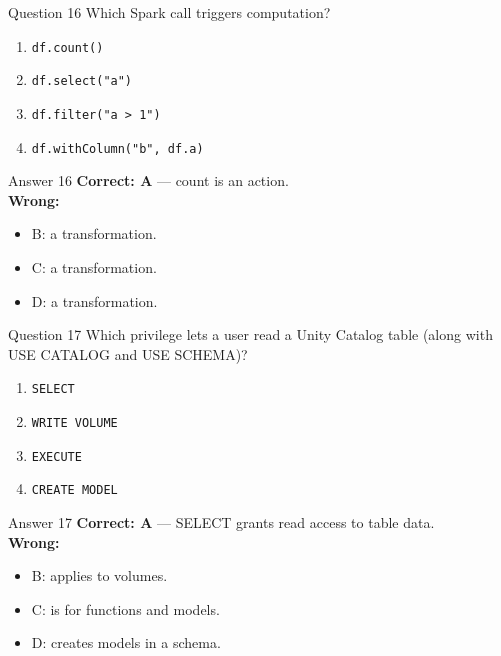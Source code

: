 \documentclass[aspectratio=169,11pt]{beamer}
\begin{document}
\begin{frame}{Question 16}
Which Spark call triggers computation?
\begin{enumerate}[label=\Alph*.]
\item \texttt{df.count()}
\item \texttt{df.select("a")}
\item \texttt{df.filter("a > 1")}
\item \texttt{df.withColumn("b", df.a)}
\end{enumerate}
\end{frame}
\begin{frame}{Answer 16}
\textbf{Correct: A} --- count is an action.\\
\vspace{0.5em}
\textbf{Wrong:}
\begin{itemize}
\item B: a transformation.
\item C: a transformation.
\item D: a transformation.
\end{itemize}
\end{frame}

\begin{frame}{Question 17}
Which privilege lets a user read a Unity Catalog table (along with USE CATALOG and USE SCHEMA)?
\begin{enumerate}[label=\Alph*.]
\item \texttt{SELECT}
\item \texttt{WRITE VOLUME}
\item \texttt{EXECUTE}
\item \texttt{CREATE MODEL}
\end{enumerate}
\end{frame}
\begin{frame}{Answer 17}
\textbf{Correct: A} --- SELECT grants read access to table data.\\
\vspace{0.5em}
\textbf{Wrong:}
\begin{itemize}
\item B: applies to volumes.
\item C: is for functions and models.
\item D: creates models in a schema.
\end{itemize}
\end{frame}
\end{document}

